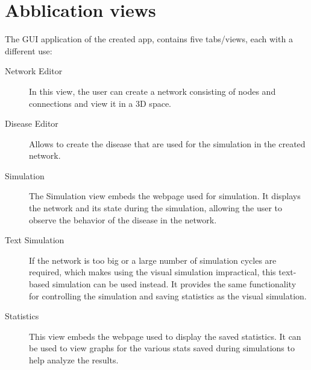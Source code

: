 \section{Abblication views}
\label{sub:thread_views}
The GUI application of the created app, contains five tabs/views, each with a different use:
\begin{description}
    \item[Network Editor] In this view, the user can create a network consisting of nodes and connections and view it in a 3D space.
    \item[Disease Editor] Allows to create the disease that are used for the simulation in the created network.
    \item[Simulation] The Simulation view embeds the webpage used for simulation. It displays the network and its state during the simulation, allowing the user to observe the behavior of the disease in the network.
    \item[Text Simulation] If the network is too big or a large number of simulation cycles are required, which makes using the visual simulation impractical, this text-based simulation can be used instead. It provides the same functionality for controlling the simulation and saving statistics as the visual simulation.
    \item[Statistics] This view embeds the webpage used to display the saved statistics. It can be used to view graphs for the various stats saved during simulations to help analyze the results.
\end{description}